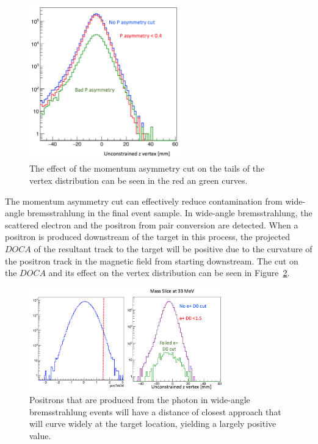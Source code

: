 \begin{figure}[htb]
  \centering
      \includegraphics[width=0.6\textwidth]{pics/searching/pasycut.png}
  \caption[Cut on the momentum asymmetry]{The effect of the momentum asymmetry cut on the tails of the vertex distribution can be seen in the red an green curves.}
  \label{fig:pasycut}
\end{figure} 

The momentum asymmetry cut can effectively reduce contamination from wide-angle bremsstrahlung in the final event sample. In wide-angle bremsstrahlung, the scattered electron and the positron from pair conversion are detected. When a positron is produced downstream of the target in this process, the projected $DOCA$ of the resultant track to the target will be positive due to the curvature of the positron track in the magnetic field from starting downstream. The cut on the $DOCA$ and its effect on the vertex distribution can be seen in Figure~\ref{fig:docacut}. 

\begin{figure}[htb]
  \centering
      \includegraphics[width=0.75\textwidth]{pics/searching/docacut.png}
  \caption[Cut on the postiron $DOCA$]{Positrons that are produced from the photon in wide-angle bremsstrahlung events will have a distance of closest approach that will curve widely at the target location, yielding a largely positive value.}
  \label{fig:docacut}
\end{figure} 

